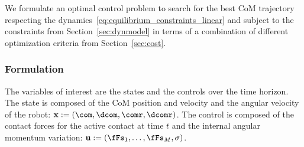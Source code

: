 \label{sec:optimal_control}

We formulate an optimal control problem to search for the best CoM trajectory respecting the dynamics~\eqref{eq:equilibrium_constraints_linear} and subject to the constraints from Section~\ref{sec:dynmodel} in terms of a combination of different optimization criteria from Section~\ref{sec:cost}.

\subsubsection*{Formulation}
The variables of interest are the states and the controls over the time horizon. The state is composed of the CoM position and velocity and the angular velocity of the robot:  ${\bf x}:=\left( \com, \dcom, \comr, \dcomr \right)$. The control is composed of the contact forces for the active contact at time $t$ and the internal angular momentum variation: ${\bf u}:= \left( \fFs_1, \dots, \fFs_M, {\bf \sigma} \right)$.

